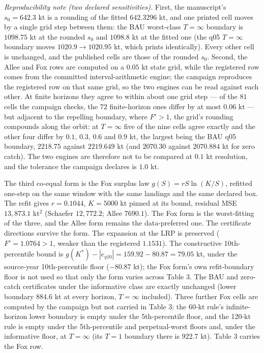 \emph{Reproducibility note (two declared sensitivities).} First, the
manuscript's \(s_0 = 642.3\) kt is a rounding of the fitted
\(642.3296\) kt, and one printed cell moves by a single grid step between
them: the BAU worst-class \(T=\infty\) boundary is \(1098.75\) kt at the
rounded \(s_0\) and \(1098.8\) kt at the fitted one (the q05
\(T=\infty\) boundary moves \(1020.9 \to 1020.95\) kt, which prints
identically). Every other cell is unchanged, and the published cells are
those of the rounded \(s_0\). Second, the Allee and Fox rows are computed
on a \(0.05\) kt state grid, while the registered row comes from the
committed interval-arithmetic engine; the campaign reproduces the
registered row on that same grid, so the two engines can be read against
each other. At finite horizons they agree to within about one grid step
--- of the \(81\) cells the campaign checks, the \(72\) finite-horizon
ones differ by at most \(0.06\) kt --- but adjacent to the repelling
boundary, where \(F' > 1\), the grid's rounding compounds along the orbit:
at \(T = \infty\) five of the nine cells agree exactly and the other
four differ by \(0.1\), \(0.3\), \(0.6\) and \(0.9\) kt, the largest
being the BAU q05 boundary, \(2218.75\) against \(2219.649\) kt (and
\(2070.30\) against \(2070.884\) kt for zero catch). The two engines are
therefore not to be compared at \(0.1\) kt resolution, and the tolerance
the campaign declares is \(1.0\) kt.

The third co-equal form is the Fox surplus law \(g(S) = rS\ln(K/S)\),
refitted one-step on the same window with the same landings and the same
declared box. The refit gives \(r = 0.1044\), \(K = 5000\) kt pinned at
its bound, residual MSE \(13{,}873.1\) kt\(^2\) (Schaefer
\(12{,}772.2\); Allee \(7690.1\)). The Fox form is the worst-fitting of
the three, and the Allee form remains the data-preferred one. The
certificate directions survive the form. The expansion at the LRP is
preserved (\(F' = 1.0764 > 1\), weaker than the registered \(1.1531\)).
The constructive 10th-percentile bound is
\(g(K^*) - |e_{q10}| = 159.92 - 80.87 = 79.05\) kt, under the
source-year 10th-percentile floor (\(-80.87\) kt); the Fox form's own
refit-boundary floor is not used so that only the form varies across
Table 3. The BAU and zero-catch certificates under the informative class
are exactly unchanged (lower boundary \(884.6\) kt at every horizon,
\(T=\infty\) included). Three further Fox cells are computed by the campaign but not carried in
Table 3: the 60-kt rule's infinite-horizon lower boundary is empty under
the 5th-percentile floor, and the 120-kt rule is empty under the
5th-percentile and perpetual-worst floors and, under the informative
floor, at \(T=\infty\) (its \(T=1\) boundary there is \(922.7\) kt). Table 3 carries the Fox row.

